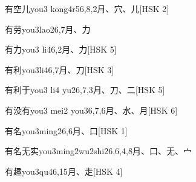 \begin{EntryWithPhonetic}{有空儿}{you3 kong4r5}{6,8,2}{⽉、⽳、⼉}[HSK 2]
\end{EntryWithPhonetic}

\begin{EntryWithPhonetic}{有劳}{you3lao2}{6,7}{⽉、⼒}
\end{EntryWithPhonetic}

\begin{EntryWithPhonetic}{有力}{you3 li4}{6,2}{⽉、⼒}[HSK 5]
\end{EntryWithPhonetic}

\begin{EntryWithPhonetic}{有利}{you3li4}{6,7}{⽉、⼑}[HSK 3]
\end{EntryWithPhonetic}

\begin{EntryWithPhonetic}{有利于}{you3 li4 yu2}{6,7,3}{⽉、⼑、⼆}[HSK 5]
\end{EntryWithPhonetic}

\begin{EntryWithPhonetic}{有没有}{you3 mei2 you3}{6,7,6}{⽉、⽔、⽉}[HSK 6]
\end{EntryWithPhonetic}

\begin{EntryWithPhonetic}{有名}{you3ming2}{6,6}{⽉、⼝}[HSK 1]
\end{EntryWithPhonetic}

\begin{EntryWithPhonetic}{有名无实}{you3ming2wu2shi2}{6,6,4,8}{⽉、⼝、⽆、⼧}
\end{EntryWithPhonetic}

\begin{EntryWithPhonetic}{有趣}{you3qu4}{6,15}{⽉、⾛}[HSK 4]
\end{EntryWithPhonetic}

